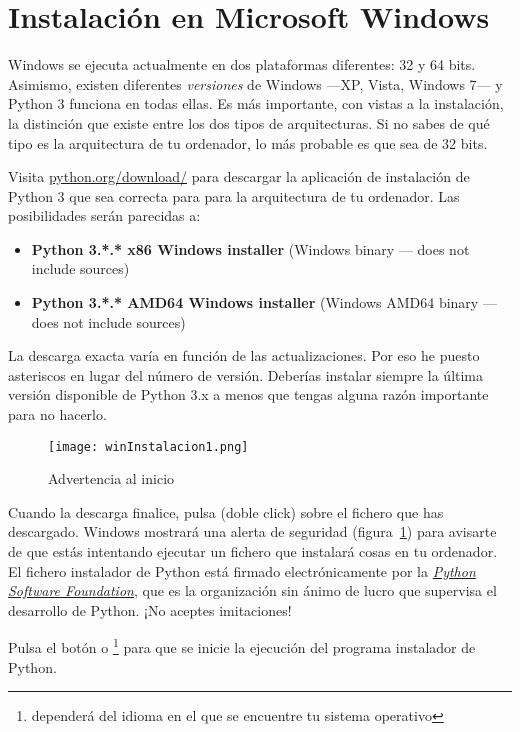 \section{Instalación en Microsoft Windows}

Windows se ejecuta actualmente en dos plataformas diferentes: 32 y 64 bits. Asimismo, existen diferentes \emph{versiones} de Windows ---XP, Vista, Windows 7--- y Python 3 funciona en todas ellas. Es más importante, con vistas a la instalación, la distinción que existe entre los dos tipos de arquitecturas. Si no sabes de qué tipo es la arquitectura de tu ordenador, lo más probable es que sea de 32 bits.

Visita \href{http://python.org/download/}{python.org/download/} para descargar la aplicación de instalación de Python 3 que sea correcta para para la arquitectura de tu ordenador. Las posibilidades serán parecidas a:

\begin{itemize}
\item \textbf{Python 3.*.* x86 Windows installer} (Windows binary --- does not include sources)
\item \textbf{Python 3.*.* AMD64 Windows installer} (Windows AMD64 binary --- does not include sources)
\end{itemize}

La descarga exacta varía en función de las actualizaciones. Por eso he puesto asteriscos en lugar del número de versión. Deberías instalar siempre la última versión disponible de Python 3.x a menos que tengas alguna razón importante para no hacerlo.

\begin{figure}[!h]
  \begin{center}
\texttt{[image: winInstalacion1.png]}
\caption{Advertencia al inicio}\label{fig01}
  \end{center}
\end{figure}

Cuando la descarga finalice, pulsa (doble click) sobre el fichero  que has descargado. Windows mostrará una alerta de seguridad (figura~\ref{fig01}) para avisarte de que estás intentando ejecutar un fichero que instalará cosas en tu ordenador. El fichero instalador de Python está firmado electrónicamente por la \href{http://www.python.org/psf/}{\emph{Python Software Foundation}}, que es la organización sin ánimo de lucro que supervisa el desarrollo de Python. ¡No aceptes imitaciones!

Pulsa el botón  o \footnote{dependerá del idioma en el que se encuentre tu sistema operativo} para que se inicie la ejecución del programa instalador de Python.

